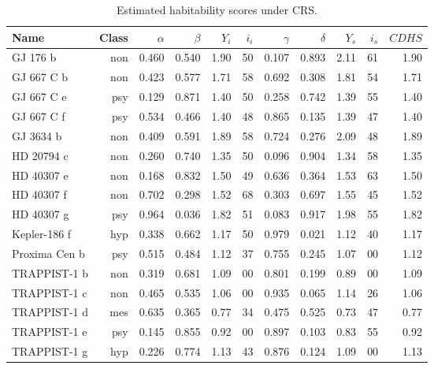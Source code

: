 \documentclass[9pt]{article}
\begin{document}
\begin{table}
  \centering
  \begin{subtable}{\textwidth}
    \centering
    \begin{tabular}{l r r r r r r r r r r}
      \toprule
      Name & Class & $\alpha$ & $\beta$ & $Y_i$ & $i_i$ & $\gamma$ & $\delta$ & $Y_s$ & $i_s$ & $\mathit{CDHS}$\\
      \midrule
      GJ 176 b & non & 0.460 & 0.540 & 1.90 & 50 & 0.107 & 0.893 & 2.11 & 61 & 1.90\\
      GJ 667 C b & non & 0.423 & 0.577 & 1.71 & 58 & 0.692 & 0.308 & 1.81 & 54 & 1.71\\
      GJ 667 C e & psy & 0.129 & 0.871 & 1.40 & 50 & 0.258 & 0.742 & 1.39 & 55 & 1.40\\
      GJ 667 C f & psy & 0.534 & 0.466 & 1.40 & 48 & 0.865 & 0.135 & 1.39 & 47 & 1.40\\
      GJ 3634 b & non & 0.409 & 0.591 & 1.89 & 58 & 0.724 & 0.276 & 2.09 & 48 & 1.89\\
      HD 20794 c & non & 0.260 & 0.740 & 1.35 & 50 & 0.096 & 0.904 & 1.34 & 58 & 1.35\\
      HD 40307 e & non & 0.168 & 0.832 & 1.50 & 49 & 0.636 & 0.364 & 1.53 & 63 & 1.50\\
      HD 40307 f & non & 0.702 & 0.298 & 1.52 & 68 & 0.303 & 0.697 & 1.55 & 45 & 1.52\\
      HD 40307 g & psy & 0.964 & 0.036 & 1.82 & 51 & 0.083 & 0.917 & 1.98 & 55 & 1.82\\
      Kepler-186 f & hyp & 0.338 & 0.662 & 1.17 & 50 & 0.979 & 0.021 & 1.12 & 40 & 1.17\\
      Proxima Cen b & psy & 0.515 & 0.484 & 1.12 & 37 & 0.755 & 0.245 & 1.07 & 00 & 1.12\\
      TRAPPIST-1 b & non & 0.319 & 0.681 & 1.09 & 00 & 0.801 & 0.199 & 0.89 & 00 & 1.09\\
      TRAPPIST-1 c & non & 0.465 & 0.535 & 1.06 & 00 & 0.935 & 0.065 & 1.14 & 26 & 1.06\\
      TRAPPIST-1 d & mes & 0.635 & 0.365 & 0.77 & 34 & 0.475 & 0.525 & 0.73 & 47 & 0.77\\
      TRAPPIST-1 e & psy & 0.145 & 0.855 & 0.92 & 00 & 0.897 & 0.103 & 0.83 & 55 & 0.92\\
      TRAPPIST-1 g & hyp & 0.226 & 0.774 & 1.13 & 43 & 0.876 & 0.124 & 1.09 & 00 & 1.13\\
      \bottomrule
    \end{tabular}
    \caption{Estimated habitability scores under CRS.}\label{tab:cdhscrs}
  \end{subtable}


\end{table}
\end{document}
